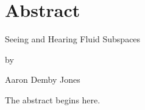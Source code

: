 \chapter*{Abstract}
{\centering
Seeing and Hearing Fluid Subspaces \par
\bigskip\bigskip
by \par
\bigskip\bigskip
Aaron Demby Jones \par
\bigskip\bigskip
}
The abstract begins here.

